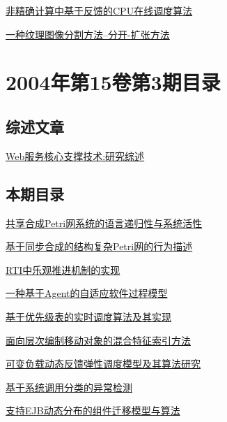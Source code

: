 \documentclass[a4paper]{article}
\begin{document}
\href{http://www.jos.org.cn/ch/reader/download_pdf.aspx?file_no=20040416&year_id=2004&quarter_id=4&falg=1}{非精确计算中基于反馈的CPU在线调度算法}

\href{http://www.jos.org.cn/ch/reader/download_pdf.aspx?file_no=20040417&year_id=2004&quarter_id=4&falg=1}{一种纹理图像分割方法--分开-扩张方法}


\section{\textbf{2004年第15卷第3期目录}}
\subsection{综述文章}
\href{http://www.jos.org.cn/ch/reader/download_pdf.aspx?file_no=20040312&year_id=2004&quarter_id=3&falg=1}{Web服务核心支撑技术:研究综述}

\subsection{本期目录}
\href{http://www.jos.org.cn/ch/reader/download_pdf.aspx?file_no=20040301&year_id=2004&quarter_id=3&falg=1}{共享合成Petri网系统的语言递归性与系统活性}

\href{http://www.jos.org.cn/ch/reader/download_pdf.aspx?file_no=20040302&year_id=2004&quarter_id=3&falg=1}{基于同步合成的结构复杂Petri网的行为描述}

\href{http://www.jos.org.cn/ch/reader/download_pdf.aspx?file_no=20040303&year_id=2004&quarter_id=3&falg=1}{RTI中乐观推进机制的实现}

\href{http://www.jos.org.cn/ch/reader/download_pdf.aspx?file_no=20040304&year_id=2004&quarter_id=3&falg=1}{一种基于Agent的自适应软件过程模型}

\href{http://www.jos.org.cn/ch/reader/download_pdf.aspx?file_no=20040305&year_id=2004&quarter_id=3&falg=1}{基于优先级表的实时调度算法及其实现}

\href{http://www.jos.org.cn/ch/reader/download_pdf.aspx?file_no=20040306&year_id=2004&quarter_id=3&falg=1}{面向层次编制移动对象的混合特征索引方法}

\href{http://www.jos.org.cn/ch/reader/download_pdf.aspx?file_no=20040307&year_id=2004&quarter_id=3&falg=1}{可变负载动态反馈弹性调度模型及其算法研究}

\href{http://www.jos.org.cn/ch/reader/download_pdf.aspx?file_no=20040308&year_id=2004&quarter_id=3&falg=1}{基于系统调用分类的异常检测}

\href{http://www.jos.org.cn/ch/reader/download_pdf.aspx?file_no=20040309&year_id=2004&quarter_id=3&falg=1}{支持EJB动态分布的组件迁移模型与算法}
\end{document}
